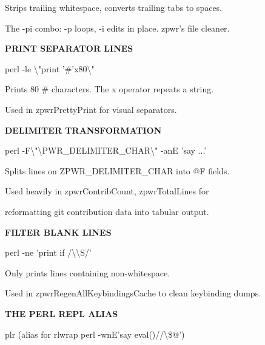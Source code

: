 \documentclass[11pt,a4paper,twoside]{book}
\begin{document}
Strips trailing whitespace, converts trailing tabs to spaces.

The -pi combo: -p loops, -i edits in place. zpwr's file cleaner.


\vspace{12pt}
{\bfseries\color{neonyellow} PRINT SEPARATOR LINES}\vspace{4pt}

\begin{codebox}
perl -le \textbackslash{}"print '\#'x80\textbackslash{}"\\
\end{codebox}

Prints 80 \# characters. The x operator repeats a string.

Used in zpwrPrettyPrint for visual separators.


\vspace{12pt}
{\bfseries\color{neonyellow} DELIMITER TRANSFORMATION}\vspace{4pt}

\begin{codebox}
perl -F\textbackslash{}"\textbackslash{}PWR\_DELIMITER\_CHAR\textbackslash{}" -anE 'say ...'\\
\end{codebox}

Splits lines on ZPWR\_DELIMITER\_CHAR into @F fields.

Used heavily in zpwrContribCount, zpwrTotalLines for

reformatting git contribution data into tabular output.


\vspace{12pt}
{\bfseries\color{neonyellow} FILTER BLANK LINES}\vspace{4pt}

\begin{codebox}
perl -ne 'print if /\textbackslash{}\textbackslash{}S/'\\
\end{codebox}

Only prints lines containing non-whitespace.

Used in zpwrRegenAllKeybindingsCache to clean keybinding dumps.


\vspace{12pt}
{\bfseries\color{neonyellow} THE PERL REPL ALIAS}\vspace{4pt}

\begin{codebox}
plr (alias for rlwrap perl -wnE'say eval()//\textbackslash{}\$@')\\
\end{codebox}
\end{document}
